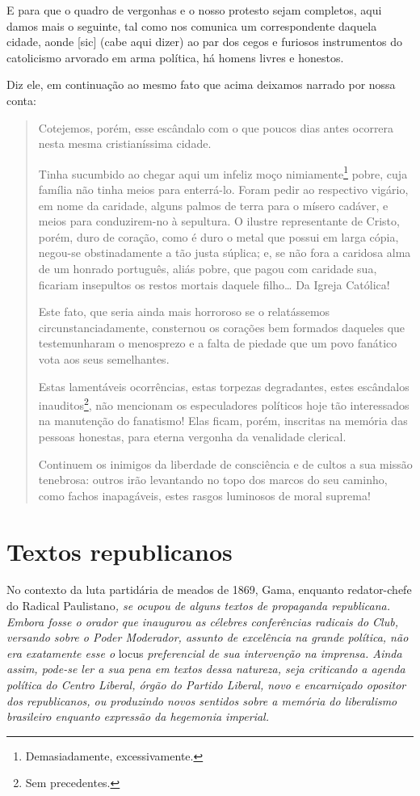 E para que o quadro de vergonhas e o nosso protesto sejam completos,
aqui damos mais o seguinte, tal como nos comunica um correspondente
daquela cidade, aonde {[}sic{]} (cabe aqui dizer) ao par dos cegos e
furiosos instrumentos do catolicismo arvorado em arma política, há
homens livres e honestos.

Diz ele, em continuação ao mesmo fato que acima deixamos narrado por
nossa conta:

\begin{quote}
Cotejemos, porém, esse escândalo com o que poucos dias antes ocorrera
nesta mesma cristianíssima cidade.

Tinha sucumbido ao chegar aqui um infeliz moço nimiamente\footnote{Demasiadamente,
  excessivamente.} pobre, cuja família não tinha meios para enterrá-lo.
Foram pedir ao respectivo vigário, em nome da caridade, alguns palmos de
terra para o mísero cadáver, e meios para conduzirem-no à sepultura. O
ilustre representante de Cristo, porém, duro de coração, como é duro o
metal que possui em larga cópia, negou-se obstinadamente a tão justa
súplica; e, se não fora a caridosa alma de um honrado português, aliás
pobre, que pagou com caridade sua, ficariam insepultos os restos mortais
daquele filho\ldots{} Da Igreja Católica!

Este fato, que seria ainda mais horroroso se o relatássemos
circunstanciadamente, consternou os corações bem formados daqueles que
testemunharam o menosprezo e a falta de piedade que um povo fanático
vota aos seus semelhantes.

Estas lamentáveis ocorrências, estas torpezas degradantes, estes
escândalos inauditos\footnote{Sem precedentes.}, não mencionam os
especuladores políticos hoje tão interessados na manutenção do
fanatismo! Elas ficam, porém, inscritas na memória das pessoas honestas,
para eterna vergonha da venalidade clerical.

Continuem os inimigos da liberdade de consciência e de cultos a sua
missão tenebrosa: outros irão levantando no topo dos marcos do seu
caminho, como fachos inapagáveis, estes rasgos luminosos de moral
suprema!
\end{quote}

\part{Textos republicanos}

\begin{argumento}
No contexto da luta partidária de meados de 1869, Gama, enquanto
redator-chefe do Radical Paulistano\emph{, se ocupou de alguns textos
de propaganda republicana. Embora fosse o orador que inaugurou as
célebres conferências radicais do Club, versando sobre o Poder
Moderador, assunto de excelência na grande política, não era exatamente
esse o} locus \emph{preferencial de sua intervenção na imprensa. Ainda
assim, pode-se ler a sua pena em textos dessa natureza, seja criticando
a agenda política do Centro Liberal, órgão do Partido Liberal, novo e
encarniçado opositor dos republicanos, ou produzindo novos sentidos
sobre a memória do liberalismo brasileiro enquanto expressão da
hegemonia imperial.}
\end{argumento}

